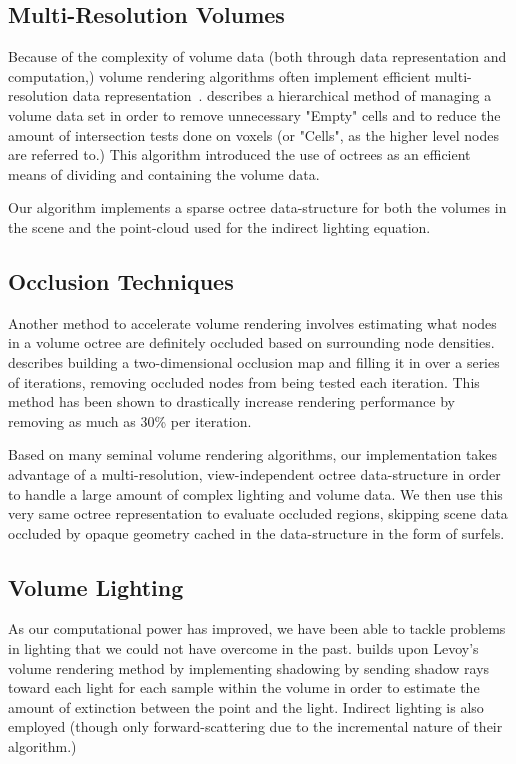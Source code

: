 \documentclass[12pt]{ucthesis}
\begin{document}
\subsection{Multi-Resolution Volumes}
Because of the complexity of volume data (both through data representation and computation,) volume rendering algorithms often implement efficient multi-resolution data representation~\cite{Westermann94}.  \cite{Levoy90} describes a hierarchical method of managing a volume data set in order to remove unnecessary "Empty" cells and to reduce the amount of intersection tests done on voxels (or "Cells", as the higher level nodes are referred to.)  This algorithm introduced the use of octrees as an efficient means of dividing and containing the volume data.

Our algorithm implements a sparse octree data-structure for both the volumes in the scene and the point-cloud used for the indirect lighting equation.

\subsection{Occlusion Techniques}
Another method to accelerate volume rendering involves estimating what nodes in a volume octree are definitely occluded based on surrounding node densities.  \cite{guthe} describes building a two-dimensional occlusion map and filling it in over a series of iterations, removing occluded nodes from being tested each iteration.  This method has been shown to drastically increase rendering performance by removing as much as 30\% per iteration.

Based on many seminal volume rendering algorithms, our implementation takes advantage of a multi-resolution, view-independent octree data-structure in order to handle a large amount of complex lighting and volume data.  We then use this very same octree representation to evaluate occluded regions, skipping scene data occluded by opaque geometry cached in the data-structure in the form of surfels.

\subsection{Volume Lighting}
As our computational power has improved, we have been able to tackle problems in lighting that we could not have overcome in the past.  \cite{kniss:03} builds upon Levoy's volume rendering method by implementing shadowing by sending shadow rays toward each light for each sample within the volume in order to estimate the amount of extinction between the point and the light.  Indirect lighting is also employed (though only forward-scattering due to the incremental nature of their algorithm.)
\end{document}
